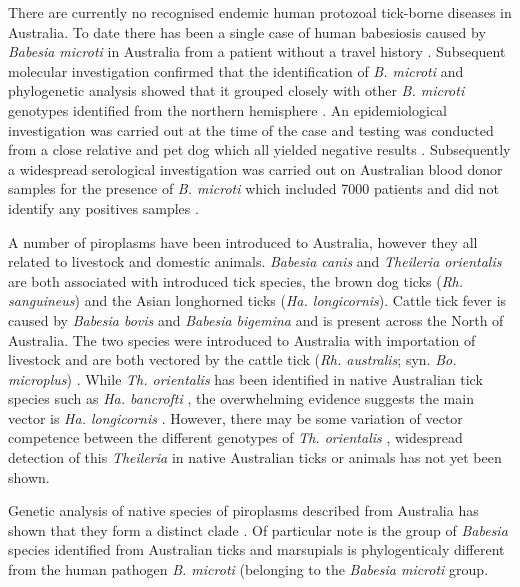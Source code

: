 \documentclass[a4paper, nobind]{templates/ociamthesis}
\begin{document}
There are currently no recognised endemic human protozoal tick-borne diseases in Australia.
To date there has been a single case of human babesiosis caused by \emph{Babesia microti} in Australia from a patient without a travel history \autocite{senanayakeFirstReportHuman2012}.
Subsequent molecular investigation confirmed that the identification of \emph{B. microti} and phylogenetic analysis showed that it grouped closely with other \emph{B. microti} genotypes identified from the northern hemisphere \autocite{papariniMolecularConfirmationFirst2014}.
An epidemiological investigation was carried out at the time of the case and testing was conducted from a close relative and pet dog which all yielded negative results \autocite{senanayakeFirstReportHuman2012}.
Subsequently a widespread serological investigation was carried out on Australian blood donor samples for the presence of \emph{B. microti} which included 7000 patients and did not identify any positives samples \autocite{faddyNoEvidenceWidespread2019}.

A number of piroplasms have been introduced to Australia, however they all related to livestock and domestic animals.
\emph{Babesia canis} and \emph{Theileria orientalis} are both associated with introduced tick species, the brown dog ticks (\emph{Rh. sanguineus}) and the Asian longhorned ticks (\emph{Ha. longicornis}).
Cattle tick fever is caused by \emph{Babesia bovis} and \emph{Babesia bigemina} and is present across the North of Australia. The two species were introduced to Australia with importation of livestock and are both vectored by the cattle tick (\emph{Rh. australis}; syn. \emph{Bo. microplus}) \autocite{angusHistoryCattleTick1996}.
While \emph{Th. orientalis} has been identified in native Australian tick species such as \emph{Ha. bancrofti} \autocite{lakewEndemicInfectionCattle2021}, the overwhelming evidence suggests the main vector is \emph{Ha. longicornis} \autocite{marendyHaemaphysalisLongicornisLifecycle2019}.
However, there may be some variation of vector competence between the different genotypes of \emph{Th. orientalis} \autocite{forshawTheileriaOrientalisIkeda2020}, widespread detection of this \emph{Theileria} in native Australian ticks or animals has not yet been shown.

Genetic analysis of native species of piroplasms described from Australia has shown that they form a distinct clade \autocite{barbosaSequenceAnalysesMitochondrial2019}.
Of particular note is the group of \emph{Babesia} species identified from Australian ticks and marsupials is phylogenticaly different from the human pathogen \emph{B. microti} (belonging to the \emph{Babesia microti} group.
\end{document}
